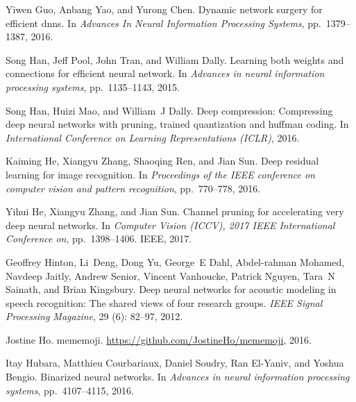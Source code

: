 \documentclass{article} %
\begin{document}
\begin{thebibliography}{36}
Yiwen Guo, Anbang Yao, and Yurong Chen.
\newblock Dynamic network surgery for efficient dnns.
\newblock In \emph{Advances In Neural Information Processing Systems}, pp.\  1379--1387, 2016.

Song Han, Jeff Pool, John Tran, and William Dally.
\newblock Learning both weights and connections for efficient neural network.
\newblock In \emph{Advances in neural information processing systems}, pp.\  1135--1143, 2015.

Song Han, Huizi Mao, and William~J Dally.
\newblock Deep compression: Compressing deep neural networks with pruning,
  trained quantization and huffman coding.
\newblock In \emph{International Conference on Learning Representations
  (ICLR)}, 2016.

Kaiming He, Xiangyu Zhang, Shaoqing Ren, and Jian Sun.
\newblock Deep residual learning for image recognition.
\newblock In \emph{Proceedings of the IEEE conference on computer vision and
  pattern recognition}, pp.\ 770--778, 2016.

Yihui He, Xiangyu Zhang, and Jian Sun.
\newblock Channel pruning for accelerating very deep neural networks.
\newblock In \emph{Computer Vision (ICCV), 2017 IEEE International Conference
  on}, pp.\ 1398--1406. IEEE, 2017.

Geoffrey Hinton, Li~Deng, Dong Yu, George~E Dahl, Abdel-rahman Mohamed, Navdeep
  Jaitly, Andrew Senior, Vincent Vanhoucke, Patrick Nguyen, Tara~N Sainath, and
  Brian Kingsbury.
\newblock Deep neural networks for acoustic modeling in speech recognition: The
  shared views of four research groups.
\newblock \emph{IEEE Signal Processing Magazine}, 29 (6):
  82--97, 2012.

Jostine Ho.
\newblock mememoji.
\newblock \url{https://github.com/JostineHo/mememoji}, 2016.

Itay Hubara, Matthieu Courbariaux, Daniel Soudry, Ran El-Yaniv, and Yoshua
  Bengio.
\newblock Binarized neural networks.
\newblock In \emph{Advances in neural information processing systems}, pp.\  4107--4115, 2016.


\end{thebibliography}
\end{document}
